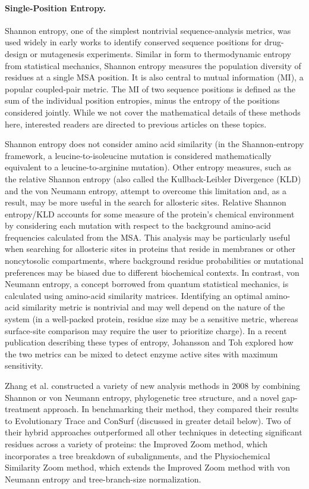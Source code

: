 \paragraph{Single-Position Entropy.} Shannon entropy, one of the simplest nontrivial sequence-analysis metrics,\cite{Shannon1948a} was used widely in early works to identify conserved sequence positions for drug-design or mutagenesis experiments.\cite{Shenkin1991a} Similar in form to thermodynamic entropy from statistical mechanics, Shannon entropy measures the population diversity of residues at a single MSA position. It is also central to mutual information (MI), a popular coupled-pair metric. The MI of two sequence positions is defined as the sum of the individual position entropies, minus the entropy of the positions considered jointly. While we not cover the mathematical details of these methods here, interested readers are directed to previous articles on these topics.\cite{Vinga2014a,Johansson2010a}
\par Shannon entropy does not consider amino acid similarity (\eg in the Shannon-entropy framework, a leucine-to-isoleucine mutation is considered mathematically equivalent to a leucine-to-arginine mutation). Other entropy measures, such as the relative Shannon entropy (also called the Kullback-Leibler Divergence (KLD)\cite{Kullback1951} and the von Neumann entropy,\cite{Zhang2008a,Peracchi2011} attempt to overcome this limitation and, as a result, may be more useful in the search for allosteric sites. Relative Shannon entropy/KLD accounts for some measure of the protein’s chemical environment by considering each mutation with respect to the background amino-acid frequencies calculated from the MSA. This analysis may be particularly useful when searching for allosteric sites in proteins that reside in membranes or other noncytosolic compartments, where background residue probabilities or mutational preferences may be biased due to different biochemical contexts. In contrast, von Neumann entropy, a concept borrowed from quantum statistical mechanics, is calculated using amino-acid similarity matrices. Identifying an optimal amino-acid similarity metric is nontrivial and may well depend on the nature of the system (\eg in a well-packed protein, residue size may be a sensitive metric, whereas surface-site comparison may require the user to prioritize charge). In a recent publication describing these types of entropy, Johansson and Toh explored how the two metrics can be mixed to detect enzyme active sites with maximum sensitivity.\cite{Johansson2010a}
\par Zhang et al. constructed a variety of new analysis methods in 2008 by combining Shannon or von Neumann entropy, phylogenetic tree structure, and a novel gap-treatment approach.\cite{Zhang2008a} In benchmarking their method, they compared their results to Evolutionary Trace and ConSurf (discussed in greater detail below). Two of their hybrid approaches outperformed all other techniques in detecting significant residues across a variety of proteins: the Improved Zoom method, which incorporates a tree breakdown of subalignments, and the Physiochemical Similarity Zoom method, which extends the Improved Zoom method with von Neumann entropy and tree-branch-size normalization.
